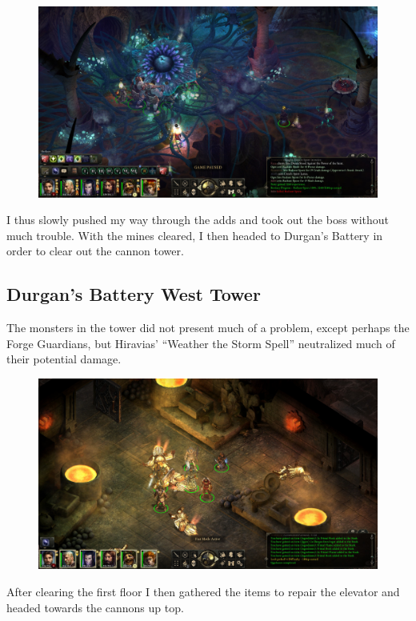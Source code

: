 \documentclass{article}
\begin{document}
\begin{figure}
\includegraphics[scale=0.33]{files/blog/2020_01_18_poe_potd_wmpt2/2020_01_18_mines5.jpg}
\end{figure}

I thus slowly pushed my way through the adds and took out the boss without much trouble.  With the mines cleared, I then headed to Durgan's Battery in order to clear out the cannon tower.

\subsection{Durgan's Battery West Tower}
The monsters in the tower did not present much of a problem, except perhaps the Forge Guardians, but Hiravias' ``Weather the Storm Spell'' neutralized much of their potential damage.

\begin{figure}
\includegraphics[scale=0.33]{files/blog/2020_01_18_poe_potd_wmpt2/2020_01_18_tower1.jpg}
\end{figure}

After clearing the first floor I then gathered the items to repair the elevator and headed towards the cannons up top.
\end{document}
